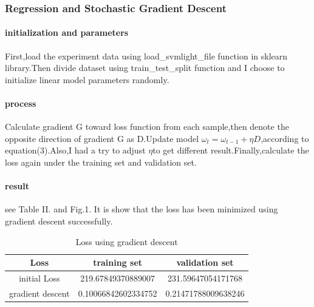 \documentclass[journal, a4paper]{IEEEtran}
\begin{document}
\subsubsection{Regression and Stochastic Gradient Descent}
\paragraph{initialization and parameters}
First,load the experiment data using load\_svmlight\_file function in sklearn library.Then divide dataset using train\_test\_split function and I choose to initialize linear model parameters randomly. 
\paragraph{process}
Calculate gradient G toward loss function from each sample,then denote the opposite direction of gradient G
 as D.Update model $ \omega_{t}=\omega_{t-1}+\eta D $,according to equation(3).Also,I had a try to adjust $\eta$to get different result.Finally,calculate the loss again under the training set and validation set.
\paragraph{result}
see Table II. and Fig.1.
It is show that the loss has been minimized using gradient descent successfully.

\begin{table}[!hbt]
		\begin{center}
		\caption{Loss using gradient descent}
		\label{tab:simParameters}
		\begin{tabular}{|c|c|c|}
			\hline
			Loss & training set & validation set\\
			\hline
			initial Loss & 219.67849370889007 & 231.59647054171768\\
			\hline
			gradient descent & 0.10066842602334752 &  0.21471788009638246\\
			\hline
		\end{tabular}
		\end{center}
	\end{table}
	
\end{document}
